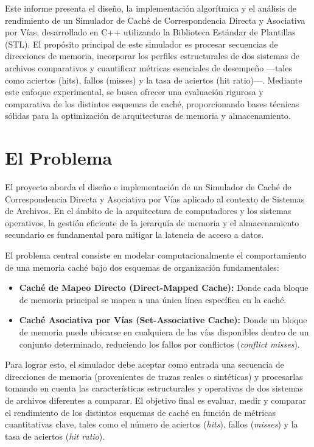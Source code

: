 \documentclass[12pt,a4paper]{article}
\begin{document}
Este informe presenta el diseño, la implementación algorítmica y el análisis de rendimiento de un Simulador de Caché de Correspondencia Directa y Asociativa por Vías, desarrollado en C++ utilizando la Biblioteca Estándar de Plantillas (STL). El propósito principal de este simulador es procesar secuencias de direcciones de memoria, incorporar los perfiles estructurales de dos sistemas de archivos comparativos y cuantificar métricas esenciales de desempeño —tales como aciertos (hits), fallos (misses) y la tasa de aciertos (hit ratio)—. Mediante este enfoque experimental, se busca ofrecer una evaluación rigurosa y comparativa de los distintos esquemas de caché, proporcionando bases técnicas sólidas para la optimización de arquitecturas de memoria y almacenamiento.

\section{El Problema}
El proyecto aborda el diseño e implementación de un Simulador de Caché de Correspondencia Directa y Asociativa por Vías aplicado al contexto de Sistemas de Archivos. En el ámbito de la arquitectura de computadores y los sistemas operativos, la gestión eficiente de la jerarquía de memoria y el almacenamiento secundario es fundamental para mitigar la latencia de acceso a datos. 

El problema central consiste en modelar computacionalmente el comportamiento de una memoria caché bajo dos esquemas de organización fundamentales:
\begin{itemize}
    \item \textbf{Caché de Mapeo Directo (Direct-Mapped Cache):} Donde cada bloque de memoria principal se mapea a una única línea específica en la caché.
    \item \textbf{Caché Asociativa por Vías (Set-Associative Cache):} Donde un bloque de memoria puede ubicarse en cualquiera de las vías disponibles dentro de un conjunto determinado, reduciendo los fallos por conflictos (\textit{conflict misses}).
\end{itemize}

Para lograr esto, el simulador debe aceptar como entrada una secuencia de direcciones de memoria (provenientes de trazas reales o sintéticas) y procesarlas tomando en cuenta las características estructurales y operativas de dos sistemas de archivos diferentes a comparar. El objetivo final es evaluar, medir y comparar el rendimiento de los distintos esquemas de caché en función de métricas cuantitativas clave, tales como el número de aciertos (\textit{hits}), fallos (\textit{misses}) y la tasa de aciertos (\textit{hit ratio}). 
\end{document}
